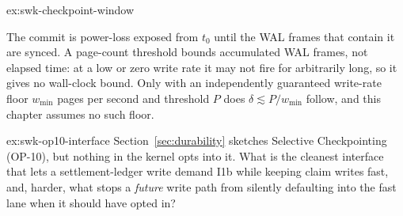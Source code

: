 \documentclass[11pt,a4paper]{article}
\theoremstyle{definition}
\theoremstyle{remark}
\begin{document}
\begin{pdsolution}{ex:swk-checkpoint-window}
\par\smallskip
\begin{center}
%
\end{center}
\par\smallskip
The commit is power-loss exposed from $t_0$ until the WAL frames that contain it are synced. A page-count threshold bounds accumulated WAL frames, not elapsed time: at a low or zero write rate it may not fire for arbitrarily long, so it gives no wall-clock bound. Only with an independently guaranteed write-rate floor $w_{\min}$ pages per second and threshold $P$ does $\delta \lesssim P/w_{\min}$ follow, and this chapter assumes no such floor.
\end{pdsolution}
\begin{pdexercise}[kind=Open,rating=3]{ex:swk-op10-interface}
Section~\ref{sec:durability} sketches Selective Checkpointing (OP-10), but nothing in the kernel opts into it. What is the cleanest interface that lets a settlement-ledger write demand I1b while keeping claim writes fast, and, harder, what stops a \emph{future} write path from silently defaulting into the fast lane when it should have opted in?
\end{pdexercise}
\end{document}
